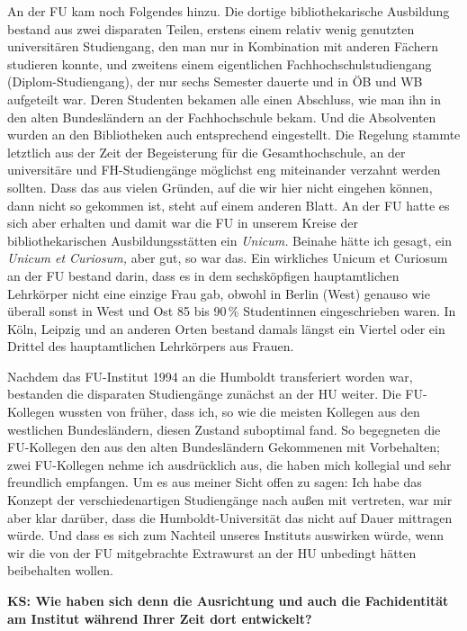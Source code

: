 \documentclass[a4paper,
fontsize=11pt,
oneside,
numbers=noperiodatend,
parskip=half-,
bibliography=totoc,
final
]{scrartcl}
\begin{document}
An der FU kam noch Folgendes hinzu. Die dortige bibliothekarische
Ausbildung bestand aus zwei disparaten Teilen, erstens einem relativ
wenig genutzten universitären Studiengang, den man nur in Kombination
mit anderen Fächern studieren konnte, und zweitens einem eigentlichen
Fachhochschulstudiengang (Diplom-Studiengang), der nur sechs Semester
dauerte und in ÖB und WB aufgeteilt war. Deren Studenten bekamen alle
einen Abschluss, wie man ihn in den alten Bundesländern an der
Fachhochschule bekam. Und die Absolventen wurden an den Bibliotheken
auch entsprechend eingestellt. Die Regelung stammte letztlich aus der
Zeit der Begeisterung für die Gesamthochschule, an der universitäre und
FH-Studiengänge möglichst eng miteinander verzahnt werden sollten. Dass
das aus vielen Gründen, auf die wir hier nicht eingehen können, dann
nicht so gekommen ist, steht auf einem anderen Blatt. An der FU hatte es
sich aber erhalten und damit war die FU in unserem Kreise der
bibliothekarischen Ausbildungsstätten ein \emph{Unicum.} Beinahe hätte
ich gesagt, ein \emph{Unicum et Curiosum,} aber gut, so war das. Ein
wirkliches Unicum et Curiosum an der FU bestand darin, dass es in dem
sechsköpfigen hauptamtlichen Lehrkörper nicht eine einzige Frau gab,
obwohl in Berlin (West) genauso wie überall sonst in West und Ost 85 bis
90\,\% Studentinnen eingeschrieben waren. In Köln, Leipzig und an
anderen Orten bestand damals längst ein Viertel oder ein Drittel des
hauptamtlichen Lehrkörpers aus Frauen.

Nachdem das FU-Institut 1994 an die Humboldt transferiert worden war,
bestanden die disparaten Studiengänge zunächst an der HU weiter. Die
FU-Kollegen wussten von früher, dass ich, so wie die meisten Kollegen
aus den westlichen Bundesländern, diesen Zustand suboptimal fand. So
begegneten die FU-Kollegen den aus den alten Bundesländern Gekommenen
mit Vorbehalten; zwei FU-Kollegen nehme ich ausdrücklich aus, die haben
mich kollegial und sehr freundlich empfangen. Um es aus meiner Sicht
offen zu sagen: Ich habe das Konzept der verschiedenartigen Studiengänge
nach außen mit vertreten, war mir aber klar darüber, dass die
Humboldt-Universität das nicht auf Dauer mittragen würde. Und dass es
sich zum Nachteil unseres Instituts auswirken würde, wenn wir die von
der FU mitgebrachte Extrawurst an der HU unbedingt hätten beibehalten
wollen.

\textbf{KS: Wie haben sich denn die Ausrichtung und auch die
Fachidentität am Institut während Ihrer Zeit dort entwickelt?}
\end{document}
